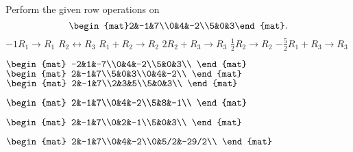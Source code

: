 

\begin{Exercise}[
name={},
title={}, 
difficulty=0,
origin={\cite{GH}}]
Perform the given row operations on $$\begin{mat}2&-1&7\\0&4&-2\\5&0&3\end{mat}.$$
\Question $-1R_1\rightarrow R_1$
\Question $R_2\leftrightarrow R_3$
\Question $R_1+R_2\rightarrow R_2$
\Question $2R_2+R_3\rightarrow R_3$
\Question $\frac12R_2\rightarrow R_2$
\Question $-\frac52R_1+R_3\rightarrow R_3$

\end{Exercise}

\begin{Answer}
\Question 
$
\begin{mat}
-2&1&-7\\0&4&-2\\5&0&3\\
\end{mat}
$
\Question 
$
\begin{mat}
2&-1&7\\5&0&3\\0&4&-2\\
\end{mat}
$
\Question
$
\begin{mat}
2&-1&7\\2&3&5\\5&0&3\\
\end{mat}
$

\Question
$
\begin{mat}
2&-1&7\\0&4&-2\\5&8&-1\\
\end{mat}
$

\Question
$
\begin{mat}
2&-1&7\\0&2&-1\\5&0&3\\
\end{mat}
$

\Question
$
\begin{mat}
2&-1&7\\0&4&-2\\0&5/2&-29/2\\
\end{mat}
$


\end{Answer}
